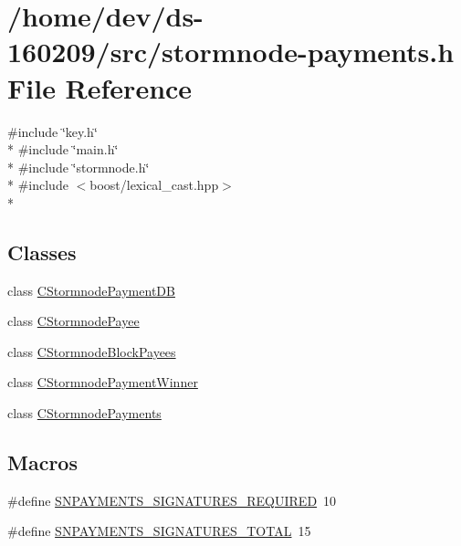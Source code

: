 \hypertarget{stormnode-payments_8h}{}\section{/home/dev/ds-\/160209/src/stormnode-\/payments.h File Reference}
\label{stormnode-payments_8h}
{\ttfamily \#include \char`\"{}key.\+h\char`\"{}}\\*
{\ttfamily \#include \char`\"{}main.\+h\char`\"{}}\\*
{\ttfamily \#include \char`\"{}stormnode.\+h\char`\"{}}\\*
{\ttfamily \#include $<$boost/lexical\+\_\+cast.\+hpp$>$}\\*
\subsection*{Classes}
\begin{DoxyCompactItemize}
\item 
class \hyperlink{class_c_stormnode_payment_d_b}{C\+Stormnode\+Payment\+D\+B}
\item 
class \hyperlink{class_c_stormnode_payee}{C\+Stormnode\+Payee}
\item 
class \hyperlink{class_c_stormnode_block_payees}{C\+Stormnode\+Block\+Payees}
\item 
class \hyperlink{class_c_stormnode_payment_winner}{C\+Stormnode\+Payment\+Winner}
\item 
class \hyperlink{class_c_stormnode_payments}{C\+Stormnode\+Payments}
\end{DoxyCompactItemize}
\subsection*{Macros}
\begin{DoxyCompactItemize}
\item 
\#define \hyperlink{stormnode-payments_8h_a562899bed0fbecb5a44802e779462049}{S\+N\+P\+A\+Y\+M\+E\+N\+T\+S\+\_\+\+S\+I\+G\+N\+A\+T\+U\+R\+E\+S\+\_\+\+R\+E\+Q\+U\+I\+R\+E\+D}~10
\item 
\#define \hyperlink{stormnode-payments_8h_af87771f9ac5a9aaa0ca06f3b164cc1ba}{S\+N\+P\+A\+Y\+M\+E\+N\+T\+S\+\_\+\+S\+I\+G\+N\+A\+T\+U\+R\+E\+S\+\_\+\+T\+O\+T\+A\+L}~15
\end{DoxyCompactItemize}
